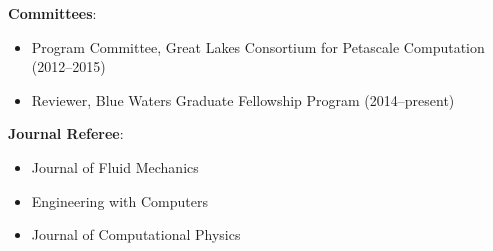 
\textbf{Committees}:
\begin{itemize}
\itemsep 0pt
 \item Program Committee, Great Lakes Consortium for Petascale Computation (2012--2015)
 \item Reviewer, Blue Waters Graduate Fellowship Program (2014--present)
\end{itemize}

\blankline


\textbf{Journal Referee}:
\begin{itemize}
\itemsep 0pt
 \item Journal of Fluid Mechanics
 \item Engineering with Computers
 \item Journal of Computational Physics
\end{itemize}
